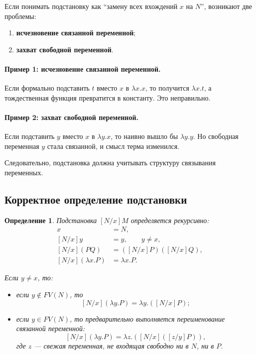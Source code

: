 \documentclass[12pt,a4paper]{article}
\newtheorem{definition}{Определение}
\theoremstyle{remark}
\begin{document}
Если понимать подстановку как ``замену всех вхождений $x$ на $N$'', возникают две проблемы:

\begin{enumerate}
    \item \textbf{исчезновение связанной переменной};
    \item \textbf{захват свободной переменной}.
\end{enumerate}

\paragraph{Пример 1: исчезновение связанной переменной.}
Если формально подставить $t$ вместо $x$ в $\lambda x.x$, то получится $\lambda x.t$, а тождественная функция превратится в константу. Это неправильно.

\paragraph{Пример 2: захват свободной переменной.}
Если подставить $y$ вместо $x$ в $\lambda y.x$, то наивно вышло бы $\lambda y.y$. Но свободная переменная $y$ стала связанной, и смысл терма изменился.

Следовательно, подстановка должна учитывать структуру связывания переменных.

\subsection{Корректное определение подстановки}

\begin{definition}
Подстановка $[N/x]M$ определяется рекурсивно:
\begin{align*}
[N/x]x &= N,\\
[N/x]y &= y,\qquad y\neq x,\\
[N/x](PQ) &= ([N/x]P)([N/x]Q),\\
[N/x](\lambda x.P) &= \lambda x.P.
\end{align*}

Если $y\neq x$, то:
\begin{itemize}
    \item если $y\notin FV(N)$, то
    \[
    [N/x](\lambda y.P)=\lambda y.([N/x]P);
    \]
    \item если $y\in FV(N)$, то предварительно выполняется переименование связанной переменной:
    \[
    [N/x](\lambda y.P)=\lambda z.([N/x]([z/y]P)),
    \]
    где $z$ --- свежая переменная, не входящая свободно ни в $N$, ни в $P$.
\end{itemize}
\end{definition}
\end{document}
